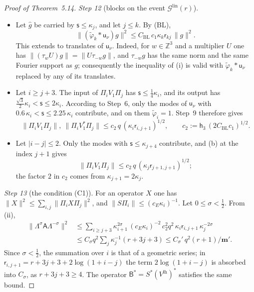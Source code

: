 \documentclass[11pt,letterpaper,reqno]{amsart}
\theoremstyle{definition}
\begin{document}
\begin{proof}[Proof of Theorem~5.14]
\emph{Step 12} (blocks on the event $\mathcal G^{\mathrm{lin}}(r)$).
\begin{itemize}
\item[(i)] Let $\hat g$ be carried by $\mathsf s\le\kappa_j$, and let $j\le k$.
By (BL),
\begin{equation*}
\|(\tilde\varphi_k*\mathsf u_\nu)g\|^2\le C_{\mathrm{BL}}\,c_1\kappa_k\mathsf r_{kj}\,\|g\|^2.
\end{equation*}
This extends to translates of $\mathsf u_\nu$.
Indeed, for $w\in\mathbb Z^3$ and a multiplier $U$ one has $\|(\tau_wU)g\|=\|U\tau_{-w}g\|$, and $\tau_{-w}g$ has the same norm and the same Fourier support as $g$;
consequently the inequality of (i) is valid with $\tilde\varphi_k*\mathsf u_\nu$ replaced by any of its translates.
\item[(ii)] Let $i\ge j+3$.
The input of $\Pi_iV_1\Pi_j$ has $\mathsf s\le\frac14\kappa_i$, and its output has $\frac{\sqrt3}{2}\kappa_i<\mathsf s\le2\kappa_i$.
According to Step~6, only the modes of $\mathsf u_\nu$ with $0.6\,\kappa_i<\mathsf s\le2.25\,\kappa_i$ contribute, and on them $\tilde\varphi_i=1$.
Step~9 therefore gives
\begin{equation*}
\|\Pi_iV_1\Pi_j\|,\ \|\Pi_iV_1^*\Pi_j\|\le c_2\,q\,(\kappa_i\mathsf r_{i,j+1})^{1/2},\qquad c_2:=\mathsf h_3\,(2C_{\mathrm{BL}}c_1)^{1/2}.
\end{equation*}
\item[(iii)] Let $|i-j|\le2$.
Only the modes with $\mathsf s\le\kappa_{j+4}$ contribute, and (b) at the index $j+1$ gives
\begin{equation*}
\|\Pi_iV_1\Pi_j\|\le c_2\,q\,(\kappa_j\mathsf r_{j+1,j+1})^{1/2};
\end{equation*}
the factor $2$ in $c_2$ comes from $\kappa_{j+1}=2\kappa_j$.
\end{itemize}

\emph{Step 13} (the condition (C1)).
For an operator $X$ one has $\|X\|^2\le\sum_{i,j}\|\Pi_iX\Pi_j\|^2$, and $\|S\Pi_i\|\le(c_E\kappa_i)^{-1}$.
Let $0\le\sigma<\frac12$.
From (ii),
\begin{align*}
\|\Lambda^\sigma\mathsf A\Lambda^{-\sigma}\|^2&\le\sum_{i\ge j+3}\kappa_{i+1}^{2\sigma}\,(c_E\kappa_i)^{-2}\,c_2^2q^2\,\kappa_i\mathsf r_{i,j+1}\,\kappa_j^{-2\sigma}\\
&\le C_\sigma q^2\sum_j\kappa_j^{-1}(r+3j+3)\le C_\sigma'\,q^2(r+1)/\mathbf m'.
\end{align*}
Since $\sigma<\frac12$, the summation over $i$ is that of a geometric series;
in $\mathsf r_{i,j+1}=r+3j+3+2\log(1+i-j)$ the term $2\log(1+i-j)$ is absorbed into $C_\sigma$, as $r+3j+3\ge4$.
The operator $\mathsf B^*=S^*(V^{\mathrm{lh}})^*$ satisfies the same bound.


\end{proof}
\end{document}
